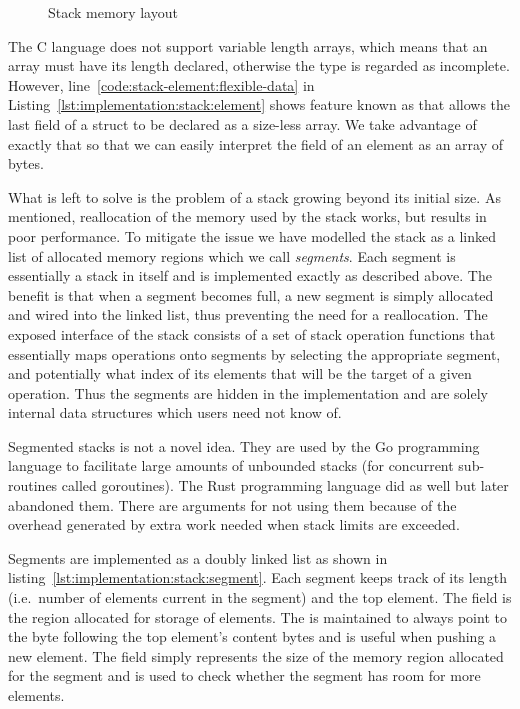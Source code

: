 \begin{figure}[H]
  \centering
  
  \caption{Stack memory layout}
  \label{fig:implementation:stack-layout}
\end{figure}

The C language does not support variable length arrays, which means that an
array must have its length declared, otherwise the type is regarded as
incomplete. However, line~\ref{code:stack-element:flexible-data} in
Listing~\ref{lst:implementation:stack:element} shows feature known as
 that allows the last field of a struct to be declared as a
size-less array. We take advantage of exactly that so that we can easily
interpret the  field of an element as an array of bytes.

What is left to solve is the problem of a stack growing beyond its initial
size. As mentioned, reallocation of the memory used by the stack works, but
results in poor performance. To mitigate the issue we have modelled the stack as
a linked list of allocated memory regions which we call \textit{segments}. Each
segment is essentially a stack in itself and is implemented exactly as described
above. The benefit is that when a segment becomes full, a new segment is simply
allocated and wired into the linked list, thus preventing the need for a
reallocation. The exposed interface of the stack consists of a set of stack
operation functions that essentially maps operations onto segments by selecting
the appropriate segment, and potentially what index of its elements that will be
the target of a given operation. Thus the segments are hidden in the
implementation and are solely internal data structures which users need not know
of.

\begin{remark}
  Segmented stacks is not a novel idea. They are used by the Go programming
  language to facilitate large amounts of unbounded stacks (for concurrent
  sub-routines called goroutines). The Rust programming language did as well but
  later abandoned them. There are arguments for not using them because of the
  overhead generated by extra work needed when stack limits are
  exceeded\cite{rust:segmented-stack, go:segmented-stack}.
\end{remark}

Segments are implemented as a doubly linked list as shown in
listing~\ref{lst:implementation:stack:segment}. Each segment keeps track of its
length (i.e.~number of elements current in the segment) and the top element. The
 field is the region allocated for storage of elements. The
 is maintained to always point to the byte following the top
element's content bytes and is useful when pushing a new element. The
 field simply represents the size of the memory region allocated for
the segment and is used to check whether the segment has room for more elements.

